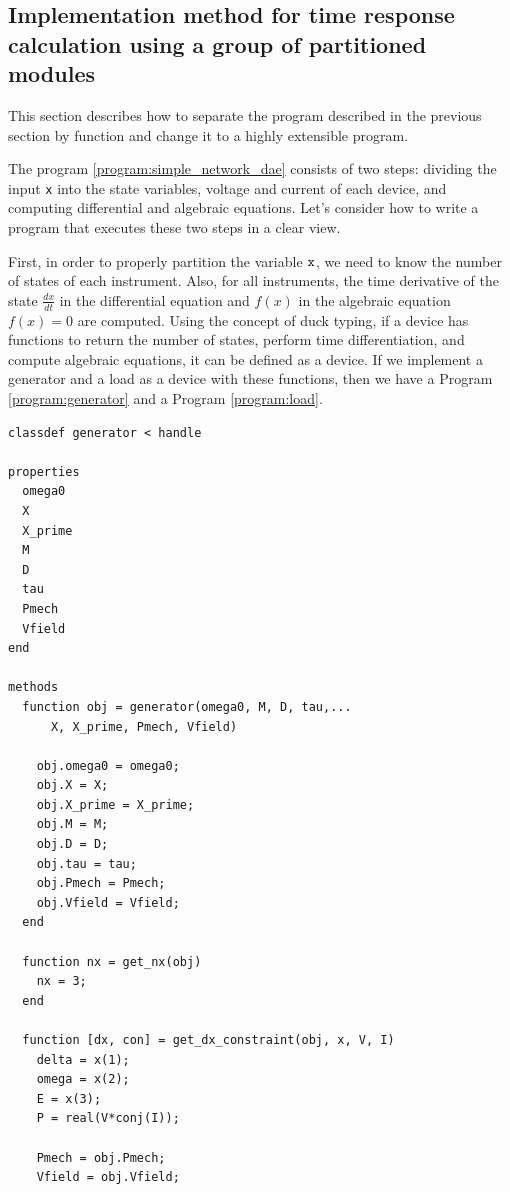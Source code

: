 \documentclass[graybox, envcountchap]{svmult}
\begin{document}
\subsection{Implementation method for time response calculation using a group of partitioned modules}
This section describes how to separate the program described in the previous section by function and change it to a highly extensible program.

\begin{example}\label{ex:gen_load}
  The program \nobreak\ref{program:simple_network_dae} consists of two steps: dividing the input \verb|x| into the state variables, voltage and current of each device, and computing differential and algebraic equations.
  Let's consider how to write a program that executes these two steps in a clear view.
 
  First, in order to properly partition the variable $\verb|x|$, we need to know the number of states of each instrument.
  Also, for all instruments, the time derivative of the state $\tfrac{dx}{dt}$ in the differential equation and $f(x)$ in the algebraic equation $f(x)=0$ are computed.
  Using the concept of duck typing, if a device has functions to return the number of states, perform time differentiation, and compute algebraic equations, it can be defined as a device.
  If we implement a generator and a load as a device with these functions, then we have a Program \nobreak\ref{program:generator} and a Program \ref{program:load}.

\smallskip
\begin{PROGRAMA}[count,title={generator.m}]\label{program:generator}
\begin{verbatim}
classdef generator < handle
  
properties
  omega0
  X
  X_prime
  M
  D
  tau
  Pmech
  Vfield
end

methods
  function obj = generator(omega0, M, D, tau,...
      X, X_prime, Pmech, Vfield)

    obj.omega0 = omega0;
    obj.X = X;
    obj.X_prime = X_prime;
    obj.M = M;
    obj.D = D;
    obj.tau = tau;
    obj.Pmech = Pmech;
    obj.Vfield = Vfield;
  end

  function nx = get_nx(obj)
    nx = 3;
  end

  function [dx, con] = get_dx_constraint(obj, x, V, I)
    delta = x(1);
    omega = x(2);
    E = x(3);
    P = real(V*conj(I));

    Pmech = obj.Pmech;
    Vfield = obj.Vfield;


\end{verbatim}
\end{PROGRAMA}
\end{example}
\end{document}
